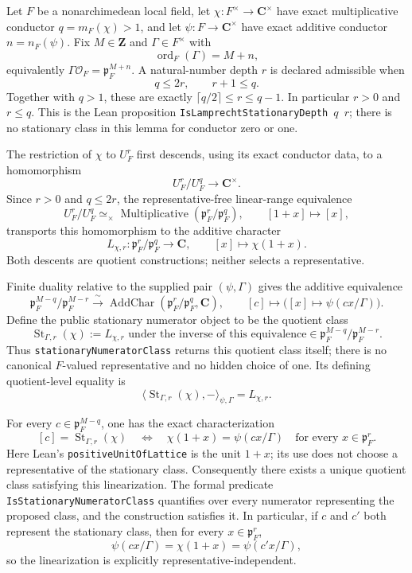 \begin{lemma}\label{mod:lamprecht-stationaryclass}
Let $F$ be a nonarchimedean local field, let
$\chi:F^\times\to\mathbf C^\times$ have exact multiplicative conductor
$q=m_F(\chi)>1$, and let $\psi:F\to\mathbf C^\times$ have exact additive
conductor $n=n_F(\psi)$.  Fix $M\in\mathbf Z$ and $\Gamma\in F^\times$
with
\[
 \operatorname{ord}_F(\Gamma)=M+n,
\]
equivalently $\Gamma\mathcal O_F=\mathfrak p_F^{M+n}$.  A natural-number
depth $r$ is declared admissible when
\[
 q\leq 2r,
 \qquad r+1\leq q.
\]
Together with $q>1$, these are exactly
$\lceil q/2\rceil\leq r\leq q-1$.  In particular $r>0$ and $r\leq q$.
This is the Lean proposition
\texttt{IsLamprechtStationaryDepth $q$ $r$}; there is no stationary class
in this lemma for conductor zero or one.

The restriction of $\chi$ to $U_F^r$ first descends, using its exact
conductor data, to a homomorphism
\[
 U_F^r/U_F^q\longrightarrow\mathbf C^\times.
\]
Since $r>0$ and $q\leq2r$, the representative-free linear-range
equivalence
\[
 U_F^r/U_F^q\simeq_\times
 \operatorname{Multiplicative}
   (\mathfrak p_F^r/\mathfrak p_F^q),
 \qquad [1+x]\longmapsto[x],
\]
transports this homomorphism to the additive character
\[
 L_{\chi,r}:\mathfrak p_F^r/\mathfrak p_F^q\longrightarrow\mathbf C,
 \qquad [x]\longmapsto\chi(1+x).
\]
Both descents are quotient constructions; neither selects a representative.

Finite duality relative to the supplied pair $(\psi,\Gamma)$ gives the
additive equivalence
\[
 \mathfrak p_F^{M-q}/\mathfrak p_F^{M-r}
 \xrightarrow{\ \sim\ }
 \operatorname{AddChar}
   (\mathfrak p_F^r/\mathfrak p_F^q,\mathbf C),
 \qquad [c]\longmapsto
   \bigl([x]\mapsto\psi(cx/\Gamma)\bigr).
\]
Define the public stationary numerator object to be the quotient class
\[
 \operatorname{St}_{\Gamma,r}(\chi)
 :=L_{\chi,r}\text{ under the inverse of this equivalence}
 \in\mathfrak p_F^{M-q}/\mathfrak p_F^{M-r}.
\]
Thus \texttt{stationaryNumeratorClass} returns this quotient class itself;
there is no canonical $F$-valued representative and no hidden choice of one.
Its defining quotient-level equality is
\[
 \langle\operatorname{St}_{\Gamma,r}(\chi),-\rangle_{\psi,\Gamma}
 =L_{\chi,r}.
\]

For every $c\in\mathfrak p_F^{M-q}$, one has the exact characterization
\[
 [c]=\operatorname{St}_{\Gamma,r}(\chi)
 \quad\Longleftrightarrow\quad
 \chi(1+x)=\psi(cx/\Gamma)
 \quad\text{for every }x\in\mathfrak p_F^r.
\]
Here Lean's \texttt{positiveUnitOfLattice} is the unit $1+x$; its use does
not choose a representative of the stationary class.  Consequently there
exists a unique quotient class satisfying this linearization.  The
formal predicate \texttt{IsStationaryNumeratorClass} quantifies over every
numerator representing the proposed class, and the construction satisfies
it.  In particular, if $c$ and $c'$ both represent the stationary class,
then for every $x\in\mathfrak p_F^r$,
\[
 \psi(cx/\Gamma)=\chi(1+x)=\psi(c'x/\Gamma),
\]
so the linearization is explicitly representative-independent.


\end{lemma}
